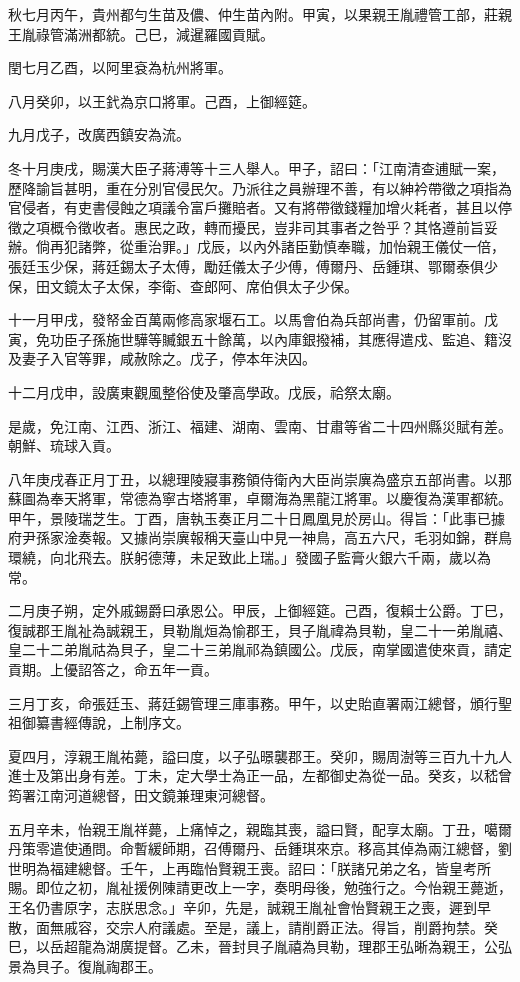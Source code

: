 \begin{pinyinscope}
秋七月丙午，貴州都勻生苗及儂、仲生苗內附。甲寅，以果親王胤禮管工部，莊親王胤祿管滿洲都統。己巳，減暹羅國貢賦。

閏七月乙酉，以阿里袞為杭州將軍。

八月癸卯，以王釴為京口將軍。己酉，上御經筵。

九月戊子，改廣西鎮安為流。

冬十月庚戌，賜漢大臣子蔣溥等十三人舉人。甲子，詔曰：「江南清查逋賦一案，歷降諭旨甚明，重在分別官侵民欠。乃派往之員辦理不善，有以紳衿帶徵之項指為官侵者，有吏書侵蝕之項議令富戶攤賠者。又有將帶徵錢糧加增火耗者，甚且以停徵之項概令徵收者。惠民之政，轉而擾民，豈非司其事者之咎乎？其恪遵前旨妥辦。倘再犯諸弊，從重治罪。」戊辰，以內外諸臣勤慎奉職，加怡親王儀仗一倍，張廷玉少保，蔣廷錫太子太傅，勵廷儀太子少傅，傅爾丹、岳鍾琪、鄂爾泰俱少保，田文鏡太子太保，李衛、查郎阿、席伯俱太子少保。

十一月甲戌，發帑金百萬兩修高家堰石工。以馬會伯為兵部尚書，仍留軍前。戊寅，免功臣子孫施世驊等贓銀五十餘萬，以內庫銀撥補，其應得遣戍、監追、籍沒及妻子入官等罪，咸赦除之。戊子，停本年決囚。

十二月戊申，設廣東觀風整俗使及肇高學政。戊辰，祫祭太廟。

是歲，免江南、江西、浙江、福建、湖南、雲南、甘肅等省二十四州縣災賦有差。朝鮮、琉球入貢。

八年庚戌春正月丁丑，以總理陵寢事務領侍衛內大臣尚崇廙為盛京五部尚書。以那蘇圖為奉天將軍，常德為寧古塔將軍，卓爾海為黑龍江將軍。以慶復為漢軍都統。甲午，景陵瑞芝生。丁酉，唐執玉奏正月二十日鳳凰見於房山。得旨：「此事已據府尹孫家淦奏報。又據尚崇廙報稱天臺山中見一神鳥，高五六尺，毛羽如錦，群鳥環繞，向北飛去。朕躬德薄，未足致此上瑞。」發國子監膏火銀六千兩，歲以為常。

二月庚子朔，定外戚錫爵曰承恩公。甲辰，上御經筵。己酉，復賴士公爵。丁巳，復誠郡王胤祉為誠親王，貝勒胤烜為愉郡王，貝子胤禕為貝勒，皇二十一弟胤禧、皇二十二弟胤祜為貝子，皇二十三弟胤祁為鎮國公。戊辰，南掌國遣使來貢，請定貢期。上優詔答之，命五年一貢。

三月丁亥，命張廷玉、蔣廷錫管理三庫事務。甲午，以史貽直署兩江總督，頒行聖祖御纂書經傳說，上制序文。

夏四月，淳親王胤祐薨，謚曰度，以子弘暻襲郡王。癸卯，賜周澍等三百九十九人進士及第出身有差。丁未，定大學士為正一品，左都御史為從一品。癸亥，以嵇曾筠署江南河道總督，田文鏡兼理東河總督。

五月辛未，怡親王胤祥薨，上痛悼之，親臨其喪，謚曰賢，配享太廟。丁丑，噶爾丹策零遣使通問。命暫緩師期，召傅爾丹、岳鍾琪來京。移高其倬為兩江總督，劉世明為福建總督。壬午，上再臨怡賢親王喪。詔曰：「朕諸兄弟之名，皆皇考所賜。即位之初，胤祉援例陳請更改上一字，奏明母後，勉強行之。今怡親王薨逝，王名仍書原字，志朕思念。」辛卯，先是，誠親王胤祉會怡賢親王之喪，遲到早散，面無戚容，交宗人府議處。至是，議上，請削爵正法。得旨，削爵拘禁。癸巳，以岳超龍為湖廣提督。乙未，晉封貝子胤禧為貝勒，理郡王弘晰為親王，公弘景為貝子。復胤祹郡王。


\end{pinyinscope}
